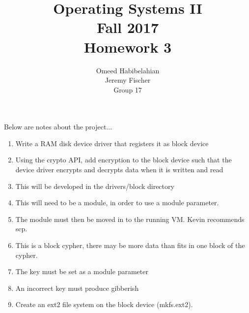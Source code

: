 \documentclass[draftclsnofoot, onecolumn, 10pt, compsoc]{IEEEtran}
\title{\textbf{Operating Systems II}\\Fall 2017\\Homework 3}
\author{Omeed Habibelahian\\Jeremy Fischer\\Group 17}
\begin{document}
	\maketitle
	\newpage
	
	Below are notes about the project...
	\begin{enumerate}
		\item Write a RAM disk device driver that registers it as block device
		\item Using the crypto API, add encryption to the block device such that the device driver encrypts and decrypts data when it is written and read
		\item This will be developed in the drivers/block directory
		\item This will need to be a module, in order to use a module parameter.
		\item The module must then be moved in to the running VM. Kevin recommends scp.
		\item This is a block cypher, there may be more data than fits in one block of the cypher.
		\item The key must be set as a module parameter
		\item An incorrect key must produce gibberish
		\item Create an ext2 file system on the block device (mkfs.ext2).
	\end{enumerate}
\end{document}
